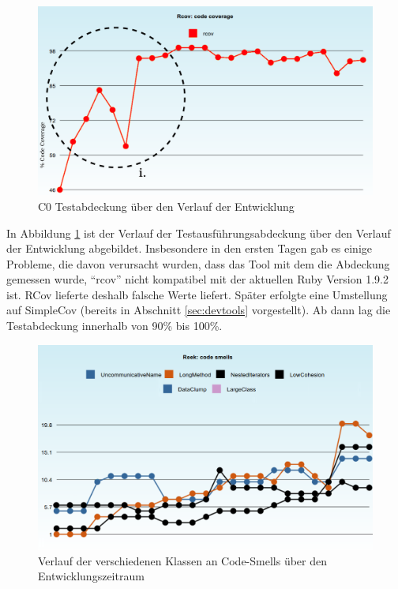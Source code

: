 \begin{figure}[htbp]
 \centering
 \includegraphics[width=\textwidth]{./diagrams/itjobs-coverage.pdf}
 \caption{C0 Testabdeckung über den Verlauf der Entwicklung}
 \label{fig:itjobsCoverage}
\end{figure}
In Abbildung \ref{fig:itjobsCoverage} ist der Verlauf der Testausführungsabdeckung über den Verlauf der Entwicklung abgebildet. Insbesondere in den ersten Tagen gab es einige Probleme, die davon verursacht wurden, dass das Tool mit dem die Abdeckung gemessen wurde, "`rcov"' nicht kompatibel mit der aktuellen Ruby Version 1.9.2 ist. RCov lieferte deshalb falsche Werte liefert. Später erfolgte eine Umstellung auf SimpleCov (bereits in Abschnitt \ref{sec:devtools} vorgestellt). Ab dann lag die Testabdeckung innerhalb von 90\% bis 100\%.

\begin{figure}[htbp]
 \centering
 \includegraphics[width=\textwidth]{./diagrams/itjobs-smells.png}
 \caption{Verlauf der verschiedenen Klassen an Code-Smells über den Entwicklungszeitraum}
 \label{fig:itjobsSmells}
\end{figure}

